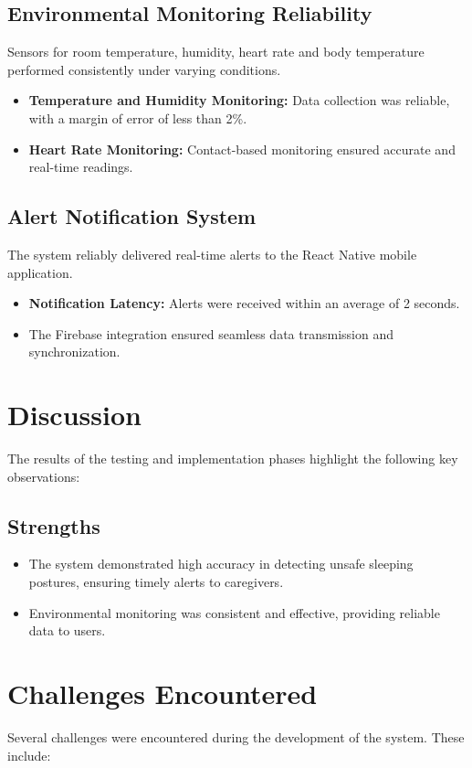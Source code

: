 \documentclass[12pt,a4paper]{report}
\begin{document}
\subsection{Environmental Monitoring Reliability}
Sensors for room temperature, humidity, heart rate and body temperature performed consistently under varying conditions.
\begin{itemize}
    \item \textbf{Temperature and Humidity Monitoring:} Data collection was reliable, with a margin of error of less than 2\%.
    \item \textbf{Heart Rate Monitoring:} Contact-based monitoring ensured accurate and real-time readings.
\end{itemize}

\subsection{Alert Notification System}
The system reliably delivered real-time alerts to the React Native mobile application.
\begin{itemize}
    \item \textbf{Notification Latency:} Alerts were received within an average of 2 seconds.
    \item The Firebase integration ensured seamless data transmission and synchronization.
\end{itemize}

\section{Discussion}
The results of the testing and implementation phases highlight the following key observations:

\subsection{Strengths}
\begin{itemize}
    \item The system demonstrated high accuracy in detecting unsafe sleeping postures, ensuring timely alerts to caregivers.
    \item Environmental monitoring was consistent and effective, providing reliable data to users.
\end{itemize}
\section{Challenges Encountered}
Several challenges were encountered during the development of the system. These include:
\end{document}
